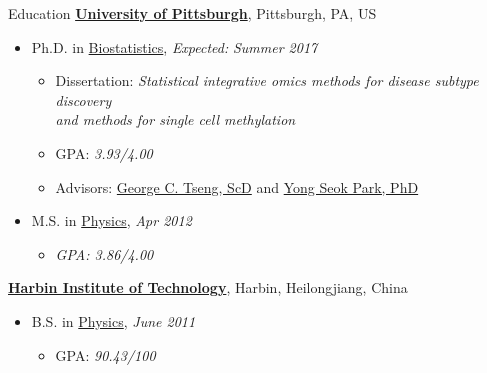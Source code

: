 \documentclass{resume} %
\begin{document}

\begin{rSection}{Education}
\href{http://www.pitt.edu}{\textbf{University of Pittsburgh}}, \hfill{Pittsburgh, PA, US}
\begin{itemize}[noitemsep,topsep=0pt]
\item Ph.D. in
        \href{http://www.publichealth.pitt.edu/biostatistics}
             {Biostatistics},
             \emph{Expected:} \hfill{\em Summer 2017}
	\begin{itemize}
        \item Dissertation:  \emph{Statistical integrative omics methods for disease subtype discovery \\
        and methods for single cell methylation}
        \item GPA: \emph{3.93/4.00}
        \item Advisors:
              \href{http://www.pitt.edu/~ctseng/}
                   {George C. Tseng, ScD} and
              \href{http://www.publichealth.pitt.edu/home/directory/yong-seok-park/}
                   {Yong Seok Park, PhD}
	\end{itemize}
	\item M.S. in
        \href{http://www.physicsandastronomy.pitt.edu}
             {Physics}, \hfill {\em Apr 2012}              
	\begin{itemize}
	\item {\emph{GPA: 3.86/4.00}}
	\end{itemize}
\end{itemize}

\href{http://www.hit.edu.cn} {\textbf{Harbin Institute of Technology}},
\hfill{Harbin, Heilongjiang, China}
\begin{itemize}[noitemsep,topsep=0pt]
\item B.S. in
        \href{http://physics.hit.edu.cn/}
             {Physics}, \hfill {\em June 2011} 
        \begin{itemize}
        \item GPA: \emph{90.43/100}
        \end{itemize}

\end{itemize}
\end{rSection}
\end{document}
